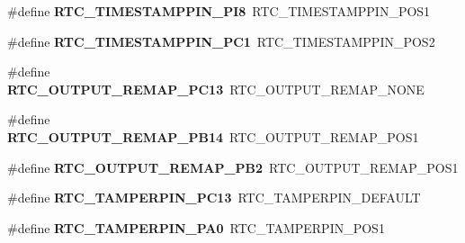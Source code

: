 \begin{DoxyCompactItemize}
\item 
\hypertarget{group___h_a_l___r_t_c___aliased___defines_ga06c626929730d0b055830978be00b438}{\#define {\bfseries R\-T\-C\-\_\-\-T\-I\-M\-E\-S\-T\-A\-M\-P\-P\-I\-N\-\_\-\-P\-I8}~R\-T\-C\-\_\-\-T\-I\-M\-E\-S\-T\-A\-M\-P\-P\-I\-N\-\_\-\-P\-O\-S1}\label{group___h_a_l___r_t_c___aliased___defines_ga06c626929730d0b055830978be00b438}

\item 
\hypertarget{group___h_a_l___r_t_c___aliased___defines_ga8bed03c3348ec3005e7b80e73fd13cc0}{\#define {\bfseries R\-T\-C\-\_\-\-T\-I\-M\-E\-S\-T\-A\-M\-P\-P\-I\-N\-\_\-\-P\-C1}~R\-T\-C\-\_\-\-T\-I\-M\-E\-S\-T\-A\-M\-P\-P\-I\-N\-\_\-\-P\-O\-S2}\label{group___h_a_l___r_t_c___aliased___defines_ga8bed03c3348ec3005e7b80e73fd13cc0}

\item 
\hypertarget{group___h_a_l___r_t_c___aliased___defines_ga677d55aef2a7915a4a75befab8a5abaf}{\#define {\bfseries R\-T\-C\-\_\-\-O\-U\-T\-P\-U\-T\-\_\-\-R\-E\-M\-A\-P\-\_\-\-P\-C13}~R\-T\-C\-\_\-\-O\-U\-T\-P\-U\-T\-\_\-\-R\-E\-M\-A\-P\-\_\-\-N\-O\-N\-E}\label{group___h_a_l___r_t_c___aliased___defines_ga677d55aef2a7915a4a75befab8a5abaf}

\item 
\hypertarget{group___h_a_l___r_t_c___aliased___defines_gac67309963a2eaf95230e716c8e3f0377}{\#define {\bfseries R\-T\-C\-\_\-\-O\-U\-T\-P\-U\-T\-\_\-\-R\-E\-M\-A\-P\-\_\-\-P\-B14}~R\-T\-C\-\_\-\-O\-U\-T\-P\-U\-T\-\_\-\-R\-E\-M\-A\-P\-\_\-\-P\-O\-S1}\label{group___h_a_l___r_t_c___aliased___defines_gac67309963a2eaf95230e716c8e3f0377}

\item 
\hypertarget{group___h_a_l___r_t_c___aliased___defines_gae3219018581da1cc5687fe218d3f2a2d}{\#define {\bfseries R\-T\-C\-\_\-\-O\-U\-T\-P\-U\-T\-\_\-\-R\-E\-M\-A\-P\-\_\-\-P\-B2}~R\-T\-C\-\_\-\-O\-U\-T\-P\-U\-T\-\_\-\-R\-E\-M\-A\-P\-\_\-\-P\-O\-S1}\label{group___h_a_l___r_t_c___aliased___defines_gae3219018581da1cc5687fe218d3f2a2d}

\item 
\hypertarget{group___h_a_l___r_t_c___aliased___defines_ga203603ca0741ea3f23beca505a121351}{\#define {\bfseries R\-T\-C\-\_\-\-T\-A\-M\-P\-E\-R\-P\-I\-N\-\_\-\-P\-C13}~R\-T\-C\-\_\-\-T\-A\-M\-P\-E\-R\-P\-I\-N\-\_\-\-D\-E\-F\-A\-U\-L\-T}\label{group___h_a_l___r_t_c___aliased___defines_ga203603ca0741ea3f23beca505a121351}

\item 
\hypertarget{group___h_a_l___r_t_c___aliased___defines_ga0eddec9c4aeae415fe983c2940a45a9d}{\#define {\bfseries R\-T\-C\-\_\-\-T\-A\-M\-P\-E\-R\-P\-I\-N\-\_\-\-P\-A0}~R\-T\-C\-\_\-\-T\-A\-M\-P\-E\-R\-P\-I\-N\-\_\-\-P\-O\-S1}\label{group___h_a_l___r_t_c___aliased___defines_ga0eddec9c4aeae415fe983c2940a45a9d}


\end{DoxyCompactItemize}
